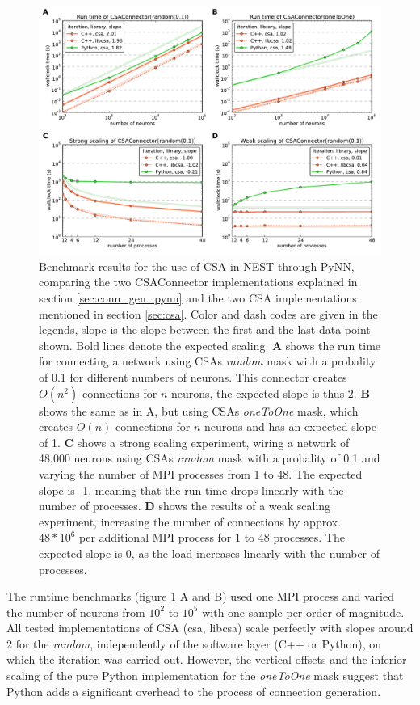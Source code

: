 \documentclass{frontiersSCNS} %
\begin{document}
\begin{figure}[ht]
\centering
\includegraphics[scale=.7]{benchmarks/CSAConnector/CSAConnector.pdf}
\caption{Benchmark results for the use of CSA in NEST through PyNN,
  comparing the two CSAConnector implementations explained in section
  \ref{sec:conn_gen_pynn} and the two CSA implementations mentioned in
  section \ref{sec:csa}. Color and dash codes are given in the
  legends, slope is the slope between the first and the last data
  point shown. Bold lines denote the expected scaling. \textbf{A}
  shows the run time for connecting a network using CSAs \emph{random}
  mask with a probality of 0.1 for different numbers of neurons. This
  connector creates $O(n^2)$ connections for $n$ neurons, the expected
  slope is thus 2. \textbf{B} shows the same as in A, but using CSAs
  \emph{oneToOne} mask, which creates $O(n)$ connections for $n$
  neurons and has an expected slope of 1. \textbf{C} shows a strong
  scaling experiment, wiring a network of 48,000 neurons using CSAs
  \emph{random} mask with a probality of 0.1 and varying the number of
  MPI processes from 1 to 48. The expected slope is -1, meaning that
  the run time drops linearly with the number of processes. \textbf{D}
  shows the results of a weak scaling experiment, increasing the
  number of connections by approx. $48*10^6$ per additional MPI
  process for 1 to 48 processes. The expected slope is 0, as the load
  increases linearly with the number of
  processes.}\label{fig:pynn_benchmarks}
\end{figure}

The runtime benchmarks (figure \ref{fig:pynn_benchmarks} A and B) used
one MPI process and varied the number of neurons from $10^2$ to $10^5$
with one sample per order of magnitude. All tested implementations of
CSA (csa, libcsa) scale perfectly with slopes around 2 for the
\emph{random}, independently of the software layer (C++ or Python), on
which the iteration was carried out. However, the vertical offsets and
the inferior scaling of the pure Python implementation for the
\emph{oneToOne} mask suggest that Python adds a significant overhead
to the process of connection generation.
\end{document}
